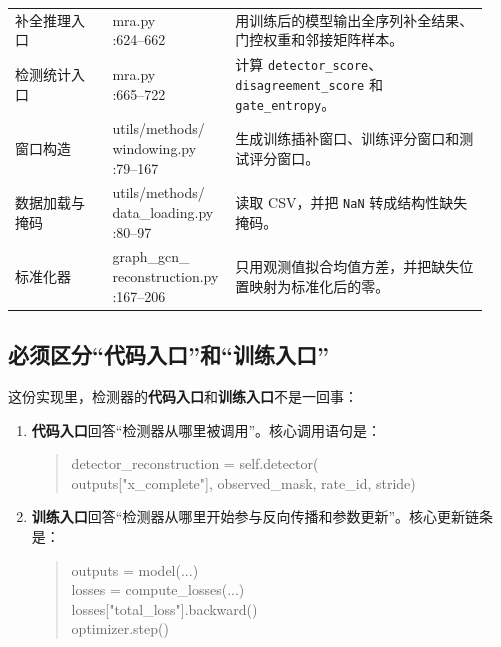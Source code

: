 \documentclass[UTF8]{ctexart}
\newcommand{\codecell}[1]{\parbox[t]{\linewidth}{\raggedright\ttfamily\small #1}}
\begin{document}
{\begin{longtable}{@{}>{\raggedright\arraybackslash}p{0.20\linewidth} >{\raggedright\arraybackslash}p{0.22\linewidth} >{\raggedright\arraybackslash}p{0.52\linewidth}@{}}
补全推理入口 & \codecell{mra.py\\:624--662} & 用训练后的模型输出全序列补全结果、门控权重和邻接矩阵样本。 \\
检测统计入口 & \codecell{mra.py\\:665--722} & 计算 \texttt{detector\_score}、\texttt{disagreement\_score} 和 \texttt{gate\_entropy}。 \\
窗口构造 & \codecell{utils/methods/\\windowing.py\\:79--167} & 生成训练插补窗口、训练评分窗口和测试评分窗口。 \\
数据加载与掩码 & \codecell{utils/methods/\\data\_loading.py\\:80--97} & 读取 CSV，并把 \texttt{NaN} 转成结构性缺失掩码。 \\
标准化器 & \codecell{graph\_gcn\_\\reconstruction.py\\:167--206} & 只用观测值拟合均值方差，并把缺失位置映射为标准化后的零。 \\
\bottomrule
\end{longtable}
}

\subsection{必须区分“代码入口”和“训练入口”}

这份实现里，检测器的\textbf{代码入口}和\textbf{训练入口}不是一回事：
\begin{enumerate}
    \item \textbf{代码入口}回答“检测器从哪里被调用”。核心调用语句是：
    \begin{quote}
        \ttfamily\small
        detector\_reconstruction = self.detector(\\
        outputs["x\_complete"], observed\_mask, rate\_id, stride)
    \end{quote}
    \item \textbf{训练入口}回答“检测器从哪里开始参与反向传播和参数更新”。核心更新链条是：
    \begin{quote}
        \ttfamily\small
        outputs = model(...)\\
        losses = compute\_losses(...)\\
        losses["total\_loss"].backward()\\
        optimizer.step()
    \end{quote}
\end{enumerate}
\end{document}
